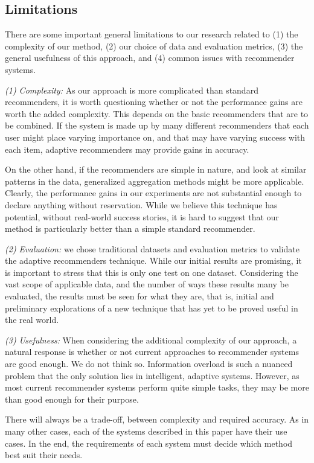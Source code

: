 \subsection{Limitations}

There are some important general limitations to our research
related to 
(1) the complexity of our method, 
(2) our choice of data and evaluation metrics, 
(3) the general usefulness of this approach, and
(4) common issues with recommender systems.

\emph{(1) Complexity:} As our approach is more complicated than standard recommenders,
it is worth questioning whether or not the performance gains are worth the added complexity.
This depends on the basic recommenders that are to be combined.
If the system is made up by many different recommenders
that each user might place varying importance on,
and that may have varying success with each item,
adaptive recommenders may provide gains in accuracy.

On the other hand, if the recommenders are simple in nature,
and look at similar patterns in the data,
generalized aggregation methods might be more applicable.
Clearly, the performance gains in our experiments
are not substantial enough to declare anything without reservation.
While we believe this technique has potential,
without real-world success stories, it is hard
to suggest that our method is particularly better
than a simple standard recommender.

\emph{(2) Evaluation:} we chose traditional datasets and evaluation metrics
to validate the adaptive recommenders technique.
While our initial results are promising, it is important to stress
that this is only one test on one dataset. Considering the vast scope
of applicable data, and the number of ways these results many be 
evaluated, the results must be seen for what they are,
that is, initial and preliminary explorations of a new technique
that has yet to be proved useful in the real world.

\emph{(3) Usefulness:}
When considering the additional complexity of our approach,
a natural response is whether or not current approaches
to recommender systems are good enough.
We do not think so. Information overload is such a nuanced problem 
that the only solution lies in intelligent, adaptive systems.
However, as most current recommender systems 
perform quite simple tasks, they may be more
than good enough for their purpose.

There will always be a trade-off, between complexity and required accuracy.
As in many other cases, each of the systems described in this paper
have their use cases. In the end, the requirements of each system
must decide which method best suit their needs.

